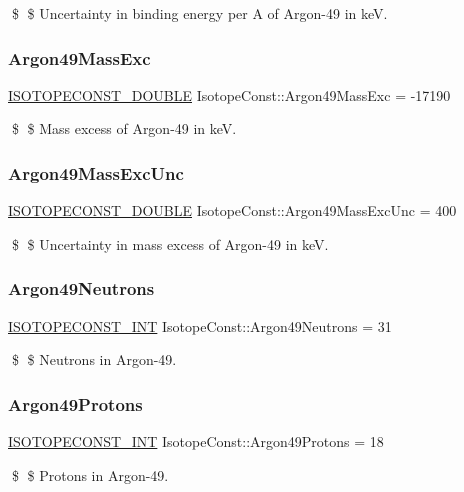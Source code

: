 \$ \$ Uncertainty in binding energy per A of Argon-\/49 in keV. \mbox{\label{group___isotope_const-_argon-_ar49_gaf962c543aa1b42fae7eb5757cce2b8ad}} 
\subsubsection{\texorpdfstring{Argon49\+Mass\+Exc}{Argon49MassExc}}
{\footnotesize\ttfamily \mbox{\hyperlink{group___isotope_const-_macros_ga8f45a7272ce02c0b4c65c44636ed719a}{I\+S\+O\+T\+O\+P\+E\+C\+O\+N\+S\+T\+\_\+\+D\+O\+U\+B\+LE}} Isotope\+Const\+::\+Argon49\+Mass\+Exc = -\/17190}

\$ \$ Mass excess of Argon-\/49 in keV. \mbox{\label{group___isotope_const-_argon-_ar49_ga5a00c268c2a404542e3bf5b51ace4929}} 
\subsubsection{\texorpdfstring{Argon49\+Mass\+Exc\+Unc}{Argon49MassExcUnc}}
{\footnotesize\ttfamily \mbox{\hyperlink{group___isotope_const-_macros_ga8f45a7272ce02c0b4c65c44636ed719a}{I\+S\+O\+T\+O\+P\+E\+C\+O\+N\+S\+T\+\_\+\+D\+O\+U\+B\+LE}} Isotope\+Const\+::\+Argon49\+Mass\+Exc\+Unc = 400}

\$ \$ Uncertainty in mass excess of Argon-\/49 in keV. \mbox{\label{group___isotope_const-_argon-_ar49_gaa9a718018ab6ab21c129967263ac2c7c}} 
\subsubsection{\texorpdfstring{Argon49\+Neutrons}{Argon49Neutrons}}
{\footnotesize\ttfamily \mbox{\hyperlink{group___isotope_const-_macros_ga5f18360b3e99483a35c32d789e62621c}{I\+S\+O\+T\+O\+P\+E\+C\+O\+N\+S\+T\+\_\+\+I\+NT}} Isotope\+Const\+::\+Argon49\+Neutrons = 31}

\$ \$ Neutrons in Argon-\/49. \mbox{\label{group___isotope_const-_argon-_ar49_ga65c09dcc4bafd9051c6e0ef007c2bee4}} 
\subsubsection{\texorpdfstring{Argon49\+Protons}{Argon49Protons}}
{\footnotesize\ttfamily \mbox{\hyperlink{group___isotope_const-_macros_ga5f18360b3e99483a35c32d789e62621c}{I\+S\+O\+T\+O\+P\+E\+C\+O\+N\+S\+T\+\_\+\+I\+NT}} Isotope\+Const\+::\+Argon49\+Protons = 18}

\$ \$ Protons in Argon-\/49. 